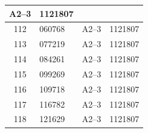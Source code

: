 \documentclass[UTF8,10pt,a4paper,fontset=fandol]{ctexart}
\newcommand{\fieldvalue}[1]{#1}
\begin{document}
\begin{center}
\begin{tabular}{|c|l|c|c|}
\fieldvalue{A2--3} &
\fieldvalue{1121807}
\\ \hline
\fieldvalue{112} &
\fieldvalue{060768} &
\fieldvalue{A2--3} &
\fieldvalue{1121807}
\\ \hline
\fieldvalue{113} &
\fieldvalue{077219} &
\fieldvalue{A2--3} &
\fieldvalue{1121807}
\\ \hline
\fieldvalue{114} &
\fieldvalue{084261} &
\fieldvalue{A2--3} &
\fieldvalue{1121807}
\\ \hline
\fieldvalue{115} &
\fieldvalue{099269} &
\fieldvalue{A2--3} &
\fieldvalue{1121807}
\\ \hline
\fieldvalue{116} &
\fieldvalue{109718} &
\fieldvalue{A2--3} &
\fieldvalue{1121807}
\\ \hline
\fieldvalue{117} &
\fieldvalue{116782} &
\fieldvalue{A2--3} &
\fieldvalue{1121807}
\\ \hline
\fieldvalue{118} &
\fieldvalue{121629} &
\fieldvalue{A2--3} &
\fieldvalue{1121807}
\\ \hline

\end{tabular}
\end{center}
\end{document}
